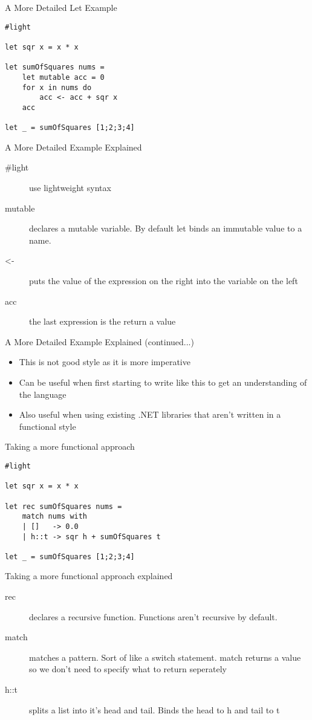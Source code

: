 \documentclass[landscape]{slides}
\begin{document}
\begin{slide}{A More Detailed Let Example}
\begin{verbatim}
#light

let sqr x = x * x

let sumOfSquares nums =
    let mutable acc = 0
    for x in nums do
        acc <- acc + sqr x
    acc

let _ = sumOfSquares [1;2;3;4]
\end{verbatim}
\end{slide}

\begin{slide}{A More Detailed Example Explained}
\begin{description}
\item[\#light] use lightweight syntax
\item[mutable] declares a mutable variable. By default let binds an immutable value to a name.
\item[\textless-] puts the value of the expression on the right into the variable on the left
\item[acc] the last expression is the return a value
\end{description}
\end{slide}

\begin{slide}{A More Detailed Example Explained (continued...)}
\begin{itemize}
\item This is not good style as it is more imperative
\item Can be useful when first starting to write like this to get an understanding of the language
\item Also useful when using existing .NET libraries that aren't written in a functional style
\end{itemize}
\end{slide}

\begin{slide}{Taking a more functional approach}
\begin{verbatim}
#light

let sqr x = x * x

let rec sumOfSquares nums =
    match nums with
    | []   -> 0.0
    | h::t -> sqr h + sumOfSquares t

let _ = sumOfSquares [1;2;3;4]
\end{verbatim}
\end{slide}

\begin{slide}{Taking a more functional approach explained}
\begin{description}
\item[rec] declares a recursive function. Functions aren't recursive by default.
\item[match] matches a pattern. Sort of like a switch statement. match returns a value so we don't need to specify what to return seperately
\item[h::t] splits a list into it's head and tail. Binds the head to h and tail to t
\end{description}
\end{slide}
\end{document}
